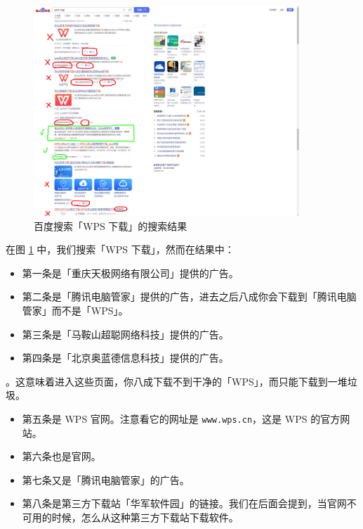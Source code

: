 \begin{figure}[htb!]
  \centering
  \includegraphics[width=10cm]{assets/Baidu_result.png}
  \caption{百度搜索「WPS 下载」的搜索结果}
  \label{baidu-wps-result}
\end{figure}

在图 \ref{baidu-wps-result} 中，我们搜索「WPS 下载」，然而在结果中：

\begin{itemize}
  \item {\color{Brown1} 第一条是「重庆天极网络有限公司」提供的广告。}
  \item {\color{Brown1} 第二条是「腾讯电脑管家」提供的广告，进去之后八成你会下载到「腾讯电脑管家」而不是「WPS」。}
  \item {\color{Brown1} 第三条是「马鞍山超聪网络科技」提供的广告。}
  \item {\color{Brown1} 第四条是「北京奥蓝德信息科技」提供的广告。}
\end{itemize}

。这意味着进入这些页面，你八成下载不到干净的「WPS」，而只能下载到一堆垃圾。

\begin{itemize}
  \item {\color{Chartreuse3} 第五条是 WPS 官网。注意看它的网址是 \texttt{www.wps.cn}，这是 WPS 的官方网站。}
  \item {\color{Chartreuse3} 第六条也是官网。}
  \item {\color{Brown1} 第七条又是「腾讯电脑管家」的广告。}
  \item {\color{DarkGoldenrod2} 第八条是第三方下载站「华军软件园」的链接。我们在后面会提到，当官网不可用的时候，怎么从这种第三方下载站下载软件。}
\end{itemize}

